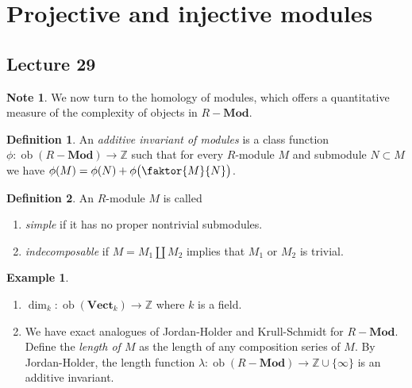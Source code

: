 \documentclass[10pt,letterpaper,cm]{nupset}
\theoremstyle{definition}
\newtheorem*{definition}{Definition}
\newtheorem{exmp}{Example}
\newtheorem{note}{Note}
\newcommand{\Z}{\mathbb Z}
\newcommand{\1}{\mathbf{1}}
\newcommand{\0}{\vec 0}
\DeclareMathOperator{\ob}{ob}
\begin{document}
\section{Projective and injective modules}

\subsection{Lecture 29}

\begin{note}
We now turn to the homology of modules, which offers a quantitative measure of the complexity of objects in $R{-}\mathbf{Mod}$.
\end{note}

\begin{definition}
An \textit{additive invariant of modules} is a class function $\phi : \ob(R{-} \mathbf{Mod}) \to \Z$ such that for every $R$-module $M$ and submodule $N\subset M$ we have $\phi(M) = \phi(N) + \phi \big(\faktor{M}{N} \big)$. 
\end{definition}

\begin{definition} An $R$-module $M$ is called
\begin{enumerate}
\item \textit{simple} if it has no proper nontrivial submodules.
\item \textit{indecomposable} if $M = M_1 \coprod M_2$ implies that $M_1$ or $M_2$ is trivial.
\end{enumerate}
\end{definition}

\begin{exmp} $ $
\begin{enumerate}
\item $\dim_k : \ob(\mathbf{Vect}_k) \to \Z$ where $k$ is a field.
\item  
We have exact analogues of Jordan-Holder and Krull-Schmidt for $R{-}\mathbf{Mod}$. Define the \textit{length of $M$} as the length of any composition series of $M$. By Jordan-Holder, the length function $\lambda : \ob(R{-} \mathbf{Mod}) \to \Z \cup \{\infty\}$ is an additive invariant.
\end{enumerate}
\end{exmp}
\end{document}
